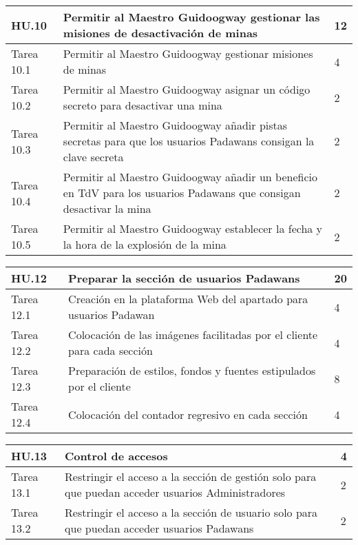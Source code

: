 \newpage

\begin{table}[t]
	\centering
	\begin{tabular}{| p{2.3cm} | p{6.7cm} | p{2cm} |}
		\rowcolor[HTML]{329A9D} 
		{\color[HTML]{FFFFFF} \textbf{HU.10}} & {\color[HTML]{FFFFFF} \textbf{Permitir al Maestro Guidoogway gestionar las misiones de desactivación de minas}} & {\color[HTML]{FFFFFF} \textbf{12}}  \\ \hline
		Tarea 10.1 & Permitir al Maestro Guidoogway gestionar misiones de minas& 4 \\ \hline
		Tarea 10.2 & Permitir al Maestro Guidoogway asignar un código secreto para desactivar una mina & 2 \\ \hline
		Tarea 10.3 & Permitir al Maestro Guidoogway añadir pistas secretas para que los usuarios Padawans consigan la clave secreta & 2 \\ \hline
		Tarea 10.4 & Permitir al Maestro Guidoogway añadir un beneficio en TdV para los usuarios Padawans que consigan desactivar la mina & 2 \\ \hline
		Tarea 10.5 & Permitir al Maestro Guidoogway establecer la fecha y la hora de la explosión de la mina & 2 \\ \hline
	\end{tabular}
\end{table}

\begin{table}[t]
	\centering
	\begin{tabular}{| p{2.3cm} | p{6.7cm} | p{2cm} |}
		\rowcolor[HTML]{329A9D} 
		{\color[HTML]{FFFFFF} \textbf{HU.12}} & {\color[HTML]{FFFFFF} \textbf{Preparar la sección de usuarios Padawans}} & {\color[HTML]{FFFFFF} \textbf{20}}  \\ \hline
		Tarea 12.1 & Creación en la plataforma Web del apartado para usuarios Padawan & 4 \\ \hline
		Tarea 12.2 & Colocación de las imágenes facilitadas por el cliente para cada sección & 4 \\ \hline
		Tarea 12.3 & Preparación de estilos, fondos y fuentes estipulados por el cliente & 8 \\ \hline
		Tarea 12.4 & Colocación del contador regresivo en cada sección & 4 \\ \hline
	\end{tabular}
\end{table}

\begin{table}[t]
	\centering
	\begin{tabular}{| p{2.3cm} | p{6.7cm} | p{2cm} |}
		\rowcolor[HTML]{329A9D} 
		{\color[HTML]{FFFFFF} \textbf{HU.13}} & {\color[HTML]{FFFFFF} \textbf{Control de accesos}} & {\color[HTML]{FFFFFF} \textbf{4}}  \\ \hline
		Tarea 13.1 & Restringir el acceso a la sección de gestión solo para que puedan acceder usuarios Administradores  & 2 \\ \hline
		Tarea 13.2 & Restringir el acceso a la sección de usuario solo para que puedan acceder usuarios Padawans  & 2 \\ \hline
	\end{tabular}
\end{table}

